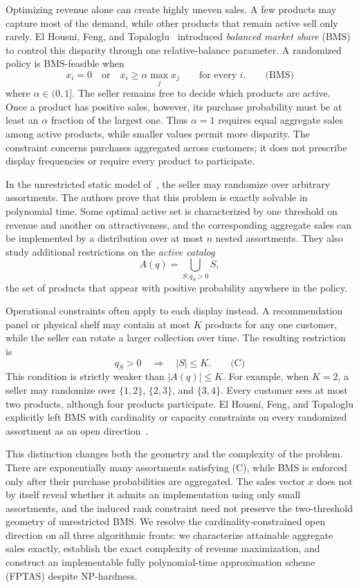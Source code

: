 \documentclass[11pt]{article}
\begin{document}
Optimizing revenue alone can create highly uneven sales.  A few products may capture most of the demand, while other products that remain active sell only rarely.  El Housni, Feng, and Topaloglu~\cite{EFTopaloglu} introduced \emph{balanced market share} (BMS) to control this disparity through one relative-balance parameter.  A randomized policy is BMS-feasible when
\[
 x_i=0
 \quad\text{or}\quad
 x_i\ge\alpha\max_jx_j
 \qquad\text{for every }i.\qquad\text{(BMS)}
\]
where $\alpha\in(0,1]$.  The seller remains free to decide which products are active.  Once a product has positive sales, however, its purchase probability must be at least an $\alpha$ fraction of the largest one.  Thus $\alpha=1$ requires equal aggregate sales among active products, while smaller values permit more disparity.  The constraint concerns purchases aggregated across customers; it does not prescribe display frequencies or require every product to participate.

In the unrestricted static model of~\cite{EFTopaloglu}, the seller may randomize over arbitrary assortments.  The authors prove that this problem is exactly solvable in polynomial time.  Some optimal active set is characterized by one threshold on revenue and another on attractiveness, and the corresponding aggregate sales can be implemented by a distribution over at most $n$ nested assortments.  They also study additional restrictions on the \emph{active catalog}
\[
 A(q)=\bigcup_{S:q_S>0}S,
\]
the set of products that appear with positive probability anywhere in the policy.

Operational constraints often apply to each display instead.  A recommendation panel or physical shelf may contain at most $K$ products for any one customer, while the seller can rotate a larger collection over time.  The resulting restriction is
\[
 q_S>0\quad\Longrightarrow\quad |S|\le K.\qquad\text{(C)}
\]
This condition is strictly weaker than $|A(q)|\le K$.  For example, when $K=2$, a seller may randomize over $\{1,2\}$, $\{2,3\}$, and $\{3,4\}$.  Every customer sees at most two products, although four products participate.  El Housni, Feng, and Topaloglu explicitly left BMS with cardinality or capacity constraints on every randomized assortment as an open direction~\cite{EFTopaloglu}.

This distinction changes both the geometry and the complexity of the problem.  There are exponentially many assortments satisfying (C), while BMS is enforced only after their purchase probabilities are aggregated.  The sales vector $x$ does not by itself reveal whether it admits an implementation using only small assortments, and the induced rank constraint need not preserve the two-threshold geometry of unrestricted BMS.  We resolve the cardinality-constrained open direction on all three algorithmic fronts: we characterize attainable aggregate sales exactly, establish the exact complexity of revenue maximization, and construct an implementable fully polynomial-time approximation scheme (FPTAS) despite NP-hardness.
\end{document}
